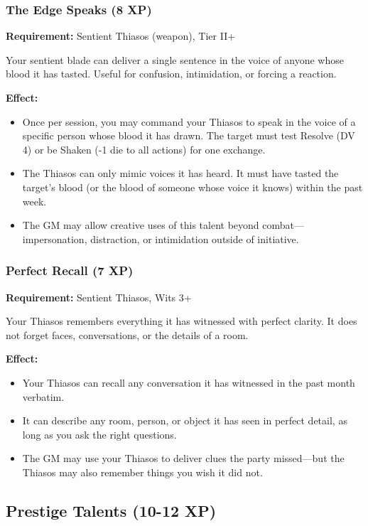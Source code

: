 \subsubsection{The Edge Speaks (8 XP)}

\textbf{Requirement:} Sentient Thiasos (weapon), Tier II+

Your sentient blade can deliver a single sentence in the voice of anyone whose blood it has tasted. Useful for confusion, intimidation, or forcing a reaction.

\textbf{Effect:}
\begin{itemize}
\item Once per session, you may command your Thiasos to speak in the voice of a specific person whose blood it has drawn. The target must test Resolve (DV 4) or be Shaken (-1 die to all actions) for one exchange.
\item The Thiasos can only mimic voices it has heard. It must have tasted the target's blood (or the blood of someone whose voice it knows) within the past week.
\item The GM may allow creative uses of this talent beyond combat—impersonation, distraction, or intimidation outside of initiative.
\end{itemize}

\subsubsection{Perfect Recall (7 XP)}

\textbf{Requirement:} Sentient Thiasos, Wits 3+

Your Thiasos remembers everything it has witnessed with perfect clarity. It does not forget faces, conversations, or the details of a room.

\textbf{Effect:}
\begin{itemize}
\item Your Thiasos can recall any conversation it has witnessed in the past month verbatim.
\item It can describe any room, person, or object it has seen in perfect detail, as long as you ask the right questions.
\item The GM may use your Thiasos to deliver clues the party missed—but the Thiasos may also remember things you wish it did not.
\end{itemize}

\subsection{Prestige Talents (10-12 XP)}

